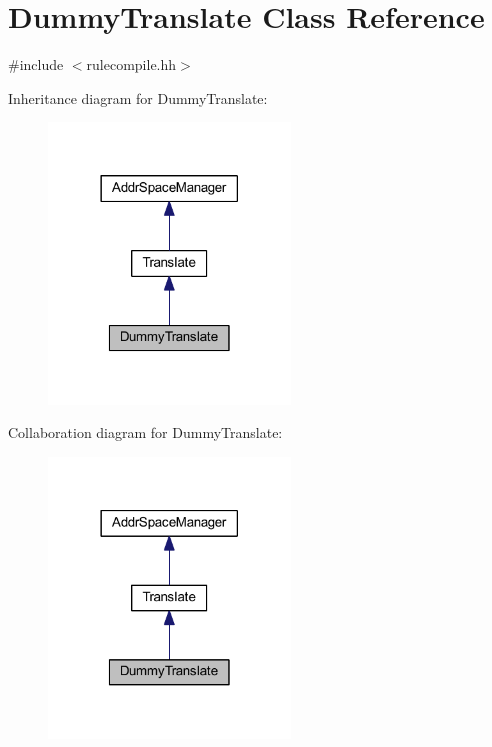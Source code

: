 \hypertarget{class_dummy_translate}{}\section{Dummy\+Translate Class Reference}
\label{class_dummy_translate}


{\ttfamily \#include $<$rulecompile.\+hh$>$}



Inheritance diagram for Dummy\+Translate\+:
\nopagebreak
\begin{figure}[H]
\begin{center}
\leavevmode
\includegraphics[width=182pt]{class_dummy_translate__inherit__graph}
\end{center}
\end{figure}


Collaboration diagram for Dummy\+Translate\+:
\nopagebreak
\begin{figure}[H]
\begin{center}
\leavevmode
\includegraphics[width=182pt]{class_dummy_translate__coll__graph}
\end{center}
\end{figure}
